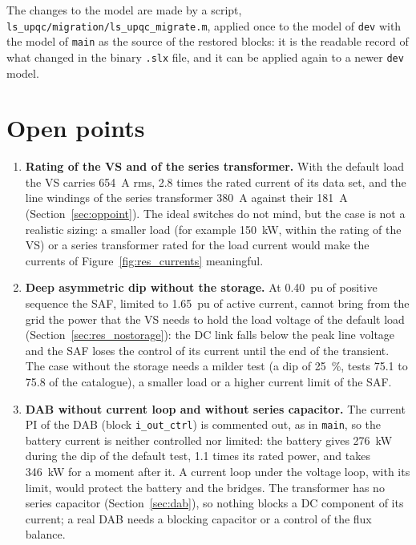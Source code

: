 \documentclass[11pt,a4paper]{scrartcl}
\newcommand{\code}[1]{\texttt{#1}}
\begin{document}
\begin{onehalfspace}
The changes to the model are made by a script, \code{ls\_upqc/migration/ls\_upqc\_migrate.m}, applied once to the model of \code{dev} with the model of \code{main} as the source of the restored blocks: it is the readable record of what changed in the binary \code{.slx} file, and it can be applied again to a newer \code{dev} model.

\section{Open points}
\label{sec:open}

\begin{enumerate}
	\item \textbf{Rating of the VS and of the series transformer.} With the default load the VS carries \SI{654}{A} rms, 2.8 times the rated current of its data set, and the line windings of the series transformer \SI{380}{A} against their \SI{181}{A} (Section~\ref{sec:oppoint}). The ideal switches do not mind, but the case is not a realistic sizing: a smaller load (for example \SI{150}{\kilo\watt}, within the rating of the VS) or a series transformer rated for the load current would make the currents of Figure~\ref{fig:res_currents} meaningful.
	\item \textbf{Deep asymmetric dip without the storage.} At \SI{0.40}{pu} of positive sequence the SAF, limited to \SI{1.65}{pu} of active current, cannot bring from the grid the power that the VS needs to hold the load voltage of the default load (Section~\ref{sec:res_nostorage}): the DC link falls below the peak line voltage and the SAF loses the control of its current until the end of the transient. The case without the storage needs a milder test (a dip of \SI{25}{\percent}, tests 75.1 to 75.8 of the catalogue), a smaller load or a higher current limit of the SAF.
	\item \textbf{DAB without current loop and without series capacitor.} The current PI of the DAB (block \code{i\_out\_ctrl}) is commented out, as in \code{main}, so the battery current is neither controlled nor limited: the battery gives \SI{276}{\kilo\watt} during the dip of the default test, 1.1 times its rated power, and takes \SI{346}{\kilo\watt} for a moment after it. A current loop under the voltage loop, with its limit, would protect the battery and the bridges. The transformer has no series capacitor (Section~\ref{sec:dab}), so nothing blocks a DC component of its current; a real DAB needs a blocking capacitor or a control of the flux balance.

\end{enumerate}
\end{onehalfspace}
\end{document}
